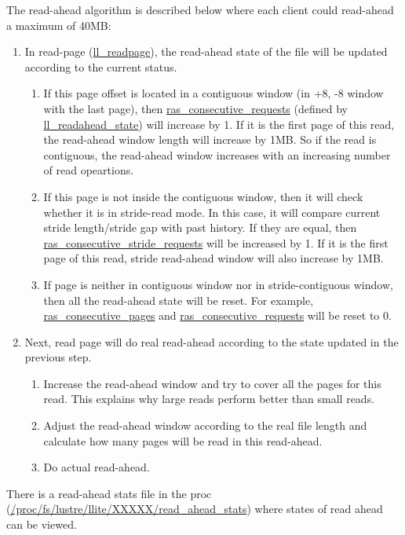 The read-ahead algorithm is described below where each client could read-ahead
a maximum of 40MB:

\begin{enumerate}

\item In read-page (\url{ll_readpage}), the read-ahead state of the file will be
updated according to the current status.
    \begin{enumerate}
     
    \item If this page offset is located in a contiguous window (in +8, -8 window
	with the last page), then \url{ras_consecutive_requests} (defined by
	\url{ll_readahead_state}) will increase by 1. If it is the first page of this
	read, the read-ahead window length will increase by 1MB.  So if the read is
	contiguous, the read-ahead window increases with an increasing number of read
	opeartions.


    \item If this page is not inside the contiguous window, then it will check
    whether it is in stride-read mode. In this case, it will compare current
    stride length/stride gap with past history. If they are equal, then
    \url{ras_consecutive_stride_requests} will be increased by 1. If it is the
    first page of this read, stride read-ahead window will also increase by
    1MB.

    \item If page is neither in contiguous window nor in stride-contiguous
    window, then all the read-ahead state will be reset. For example,
    \url{ras_consecutive_pages} and \url{ras_consecutive_requests} will be
    reset to 0.

    \end{enumerate}

\item Next, read page will do real read-ahead according to the state updated
in the previous step.

     \begin{enumerate}

      \item Increase the read-ahead window and try to cover all the pages for
      this read. This explains why large reads perform better than small
      reads.
       
       \item Adjust the read-ahead window according to the real file length and
       calculate how many pages will be read in this read-ahead.
       
      \item Do actual read-ahead.
    \end{enumerate}

\end{enumerate}

There is a read-ahead stats file in the proc
(\url{/proc/fs/lustre/llite/XXXXX/read_ahead_stats}) where states of read
ahead can be viewed.

